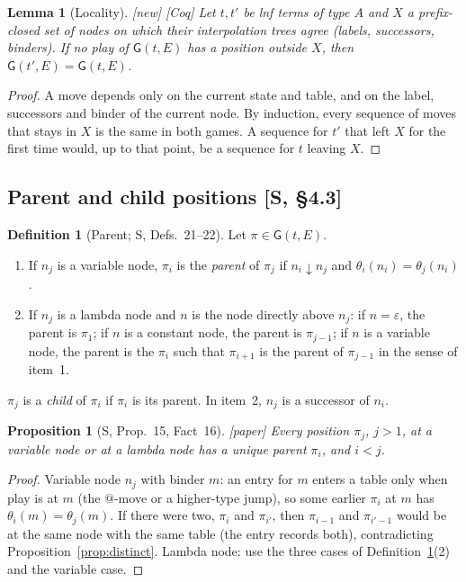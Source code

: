 \documentclass[11pt]{article}
\newcommand{\Gm}{\mathsf{G}}
\newcommand{\bnd}{\mathrel{\downarrow}}
\newcommand{\Paper}{\textsf{[paper]}}
\newcommand{\New}{\textsf{[new]}}
\newcommand{\Coq}{\textsf{[Coq]}}
\theoremstyle{plain}
\newtheorem{proposition}[theorem]{Proposition}
\newtheorem{lemma}[theorem]{Lemma}
\theoremstyle{definition}
\newtheorem{definition}[theorem]{Definition}
\theoremstyle{remark}
\begin{document}
\begin{lemma}[Locality]\label{lem:locality}
\New{} \Coq{} Let $t,t'$ be lnf terms of type $A$ and $X$ a
prefix-closed set of nodes on which their interpolation trees agree
(labels, successors, binders).  If no play of $\Gm(t,E)$ has a position
outside $X$, then $\Gm(t',E)=\Gm(t,E)$.
\end{lemma}
\begin{proof}
A move depends only on the current state and table, and on the label,
successors and binder of the current node.  By induction, every
sequence of moves that stays in $X$ is the same in both games.  A
sequence for $t'$ that left $X$ for the first time would, up to that
point, be a sequence for $t$ leaving $X$.
\end{proof}

\subsection{Parent and child positions [S, \S4.3]}

\begin{definition}[Parent; S, Defs.~21--22]\label{def:parent}
Let $\pi\in\Gm(t,E)$.
\begin{enumerate}
\item If $n_j$ is a variable node, $\pi_i$ is the \emph{parent} of
  $\pi_j$ if $n_i\bnd n_j$ and $\theta_i(n_i)=\theta_j(n_i)$.
\item If $n_j$ is a lambda node and $n$ is the node directly above
  $n_j$: if $n=\varepsilon$, the parent is $\pi_1$; if $n$ is a constant
  node, the parent is $\pi_{j-1}$; if $n$ is a variable node, the parent
  is the $\pi_i$ such that $\pi_{i+1}$ is the parent of $\pi_{j-1}$ in the
  sense of item~1.
\end{enumerate}
$\pi_j$ is a \emph{child} of $\pi_i$ if $\pi_i$ is its parent.  In
item~2, $n_j$ is a successor of $n_i$.
\end{definition}

\begin{proposition}[S, Prop.~15, Fact~16]\label{prop:parent}
\Paper{} Every position $\pi_j$, $j>1$, at a variable node or at a lambda
node has a unique parent $\pi_i$, and $i<j$.
\end{proposition}
\begin{proof}
Variable node $n_j$ with binder $m$: an entry for $m$ enters a table
only when play is at $m$ (the $@$-move or a higher-type jump), so some
earlier $\pi_i$ at $m$ has $\theta_i(m)=\theta_j(m)$.  If there were two,
$\pi_i$ and $\pi_{i'}$, then $\pi_{i-1}$ and $\pi_{i'-1}$ would be at the
same node with the same table (the entry records both), contradicting
Proposition~\ref{prop:distinct}.  Lambda node: use the three cases of
Definition~\ref{def:parent}(2) and the variable case.
\end{proof}
\end{document}
